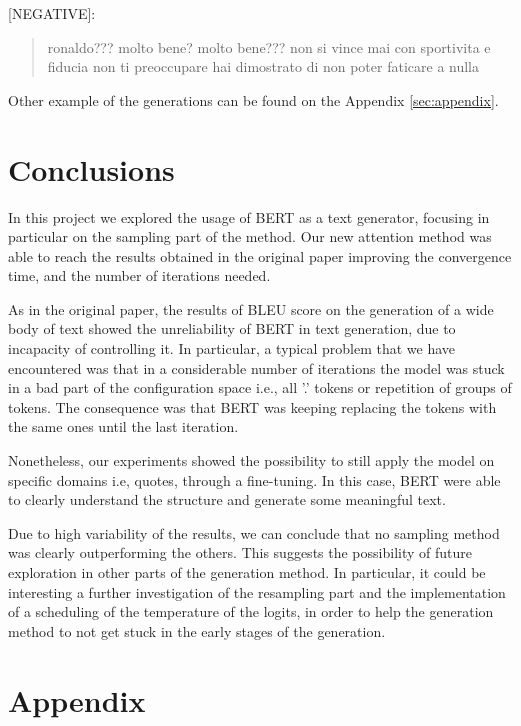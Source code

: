 \documentclass[10pt,twocolumn,letterpaper]{article}
\begin{document}
[NEGATIVE]:
\begin{quote}
   ronaldo??? molto bene? molto bene??? non si vince mai con sportivita e fiducia non ti preoccupare hai dimostrato di non poter faticare a nulla
\end{quote}

Other example of the generations can be found on the Appendix \ref{sec:appendix}.

\section{Conclusions}
In this project we explored the usage of BERT as a text generator,
focusing in particular on the sampling part of the method.
Our new attention method was able to reach the results obtained in the original paper
improving the convergence time, and the number of iterations needed.

As in the original paper, the results of BLEU score on the generation of a wide body of text
showed the unreliability of BERT in text generation,
due to incapacity of controlling it.
In particular, a typical problem that we have encountered was that in
a considerable number of iterations the model was stuck in a bad part of the
configuration space i.e., all '.' tokens or repetition of groups of tokens.
The consequence was that BERT was keeping replacing the tokens with the same ones
until the last iteration.

Nonetheless, our experiments showed the possibility to still apply the model
on specific domains i.e, quotes, through a fine-tuning.
In this case, BERT were able to clearly understand
the structure and generate some meaningful text.

Due to high variability of the results, we can conclude that no sampling method was clearly
outperforming the others. This suggests the possibility of future exploration in other parts
of the generation method. In particular, it could be interesting a further investigation
of the resampling part and the implementation of a scheduling of the temperature of the logits,
in order to help the generation method to not get stuck in the early stages of the generation.




\section*{Appendix}\label{sec:appendix}
\end{document}
